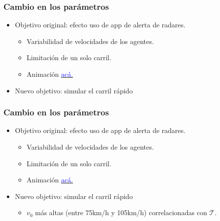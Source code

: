 \documentclass[10pt, compress]{beamer}
\begin{document}
\begin{frame}[fragile]
\frametitle{Cambio en los par\'ametros}

\begin{itemize}
\item Objetivo original: efecto uso de app de alerta de radares.
	\begin{itemize}
	\item Variabilidad de velocidades de los agentes.
	\item Limitaci\'on de un solo carril.
	\item Animaci\'on \href{https://youtu.be/NnljPUTmnGE}{\textcolor{blue}{ac\'a.}}
	\end{itemize}
\item Nuevo objetivo: simular el carril r\'apido
\end{itemize}

\end{frame}

\begin{frame}[fragile]
\frametitle{Cambio en los par\'ametros}

\begin{itemize}
\item Objetivo original: efecto uso de app de alerta de radares.
	\begin{itemize}
	\item Variabilidad de velocidades de los agentes.
	\item Limitaci\'on de un solo carril.
	\item Animaci\'on \href{https://youtu.be/NnljPUTmnGE}{\textcolor{blue}{ac\'a.}}
	\end{itemize}
\item Nuevo objetivo: simular el carril r\'apido
	\begin{itemize}
	\item $v_0$ m\'as altas (entre 75km/h y 105km/h) correlacionadas con $\mathcal{T}$.
	\end{itemize}
\end{itemize}

\end{frame}
\end{document}

